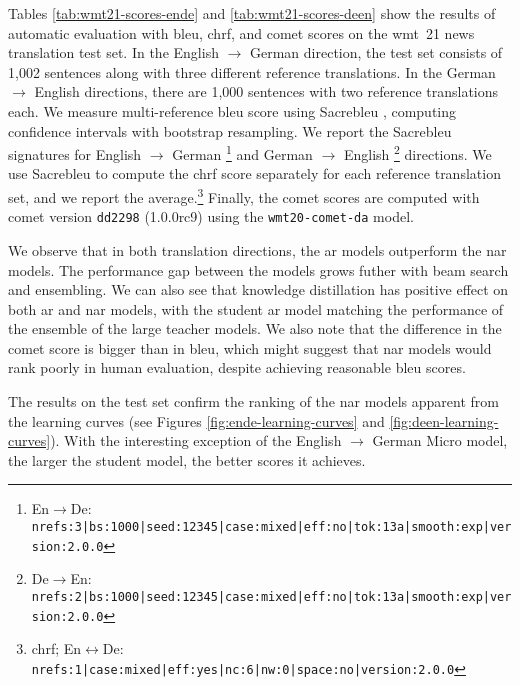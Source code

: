 Tables \ref{tab:wmt21-scores-ende} and \ref{tab:wmt21-scores-deen} show the
results of automatic evaluation with \acs{bleu}, \acs{chrf}, and \acs{comet}
scores on the \acs{wmt}~21 news translation test set. In the English
$\rightarrow$ German direction, the test set consists of 1,002 sentences along
with three different reference translations. In the German $\rightarrow$
English directions, there are 1,000 sentences with two reference translations
each. We measure multi-reference \acs{bleu} score using Sacrebleu
\citep{post-2018-call}, computing confidence intervals with bootstrap
resampling. We report the Sacrebleu signatures for English $\rightarrow$
German%
\footnote{En$\rightarrow$De: {\scriptsize
    \texttt{nrefs:3|bs:1000|seed:12345|case:mixed|eff:no|tok:13a|smooth:exp|version:2.0.0}}}
and German $\rightarrow$ English%
\footnote{De$\rightarrow$En: {\scriptsize
    \texttt{nrefs:2|bs:1000|seed:12345|case:mixed|eff:no|tok:13a|smooth:exp|version:2.0.0}}}
directions. We use Sacrebleu to compute the \acs{chrf} score separately for
each reference translation set, and we report the average.\footnote{\acs{chrf};
  En$\leftrightarrow$De: {\scriptsize
    \texttt{nrefs:1|case:mixed|eff:yes|nc:6|nw:0|space:no|version:2.0.0}}}
Finally, the \acs{comet} scores are computed with \acs{comet} version
\texttt{dd2298} (1.0.0rc9) using the \texttt{wmt20-comet-da} model.

We observe that in both translation directions, the \ac{ar} models outperform
the \ac{nar} models. The performance gap between the models grows futher with
beam search and ensembling. We can also see that knowledge distillation has
positive effect on both \ac{ar} and \ac{nar} models, with the student \ac{ar}
model matching the performance of the ensemble of the large teacher models.
We also note that the difference in the \acs{comet} score is bigger than in
\acs{bleu}, which might suggest that \acs{nar} models would rank poorly in
human evaluation, despite achieving reasonable \acs{bleu} scores.


The results on the test set confirm the ranking of the \acs{nar} models
apparent from the learning curves (see Figures \ref{fig:ende-learning-curves}
and \ref{fig:deen-learning-curves}). With the interesting exception of the
English $\rightarrow$ German Micro model, the larger the student model, the
better scores it achieves.

